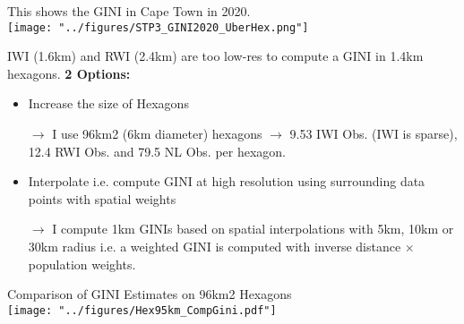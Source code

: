 \documentclass[compress,xcolor=dvipsnames]{beamer}
\begin{document}
\begin{frame}
This shows the GINI in Cape Town in 2020. \\ \vspace{1mm}
\texttt{[image: "../figures/STP3\_GINI2020\_UberHex.png"]}
\end{frame}

\begin{frame}
IWI (1.6km) and RWI (2.4km) are too low-res to compute a GINI in 1.4km hexagons. \textbf{2 Options:} \vspace{2mm}
\begin{itemize}
\item Increase the size of Hexagons
\item[$\to$] I use 96km2 (6km diameter) hexagons $\to$ 9.53 IWI Obs. (IWI is sparse), 12.4 RWI Obs. and 79.5 NL Obs. per hexagon.
\item Interpolate i.e. compute GINI at high resolution using surrounding data points with spatial weights
\item[$\to$] I compute 1km GINIs based on spatial interpolations with 5km, 10km or 30km radius i.e. a weighted GINI is computed with inverse distance $\times$ population weights. 
\end{itemize} 
\end{frame}

\begin{frame}
Comparison of GINI Estimates on 96km2 Hexagons \\ \vspace{1mm}
\texttt{[image: "../figures/Hex95km\_CompGini.pdf"]}
\begin{table}[ht] \vspace{-5mm}
\centering
\caption{Population Weighted GINI's in 96km2 Hexagons}
\vspace{-4mm}
\end{table}
\end{frame}
\end{document}
